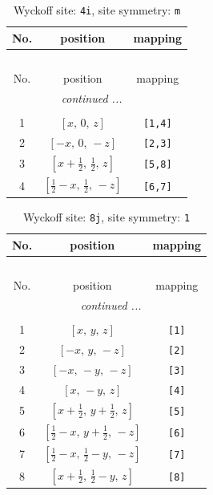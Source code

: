 \documentclass[fleqn,8pt]{jsarticle}
\begin{document}
\renewcommand{\arraystretch}{1.2}
\begin{longtable}{ccc}
\caption{Wyckoff site: {\tt 4i}, site symmetry: {\tt m}}
 \\
 \hline \hline
No. & position & mapping \\ \hline \endfirsthead

\multicolumn{2}{l}{\tablename\ \thetable{}} \\
 \hline \hline
No. & position & mapping \\ \hline \endhead

 \hline \hline
\multicolumn{2}{r}{\footnotesize\it continued ...} \\ \endfoot

 \hline \hline
\multicolumn{2}{r}{} \\ \endlastfoot

1 & $\left[ x,\, 0,\, z \right]$ & {\tt [1,4]} \\ \hline
2 & $\left[ - x,\, 0,\, - z \right]$ & {\tt [2,3]} \\ \hline
3 & $\left[ x + \frac{1}{2},\, \frac{1}{2},\, z \right]$ & {\tt [5,8]} \\ \hline
4 & $\left[ \frac{1}{2} - x,\, \frac{1}{2},\, - z \right]$ & {\tt [6,7]} \\
\end{longtable}
\renewcommand{\arraystretch}{1.2}
\begin{longtable}{ccc}
\caption{Wyckoff site: {\tt 8j}, site symmetry: {\tt 1}}
 \\
 \hline \hline
No. & position & mapping \\ \hline \endfirsthead

\multicolumn{2}{l}{\tablename\ \thetable{}} \\
 \hline \hline
No. & position & mapping \\ \hline \endhead

 \hline \hline
\multicolumn{2}{r}{\footnotesize\it continued ...} \\ \endfoot

 \hline \hline
\multicolumn{2}{r}{} \\ \endlastfoot

1 & $\left[ x,\, y,\, z \right]$ & {\tt [1]} \\ \hline
2 & $\left[ - x,\, y,\, - z \right]$ & {\tt [2]} \\ \hline
3 & $\left[ - x,\, - y,\, - z \right]$ & {\tt [3]} \\ \hline
4 & $\left[ x,\, - y,\, z \right]$ & {\tt [4]} \\ \hline
5 & $\left[ x + \frac{1}{2},\, y + \frac{1}{2},\, z \right]$ & {\tt [5]} \\ \hline
6 & $\left[ \frac{1}{2} - x,\, y + \frac{1}{2},\, - z \right]$ & {\tt [6]} \\ \hline
7 & $\left[ \frac{1}{2} - x,\, \frac{1}{2} - y,\, - z \right]$ & {\tt [7]} \\ \hline
8 & $\left[ x + \frac{1}{2},\, \frac{1}{2} - y,\, z \right]$ & {\tt [8]} \\
\end{longtable}
\end{document}
